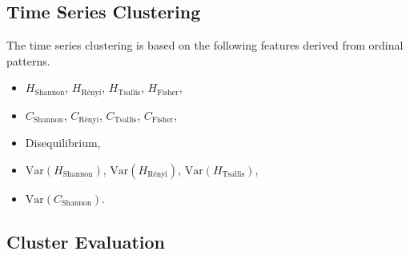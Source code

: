 \documentclass[12pt,a4paper]{article}
\begin{document}
\subsection{Time Series Clustering}
The time series clustering is based on the following features derived from ordinal patterns.

\begin{itemize}
	\item $H_{\text{Shannon}}$,
	$H_{\text{Rényi}}$,
	$H_{\text{Tsallis}}$,
	$H_{\text{Fisher}}$,
	
	\item $C_{\text{Shannon}}$,
	$C_{\text{Rényi}}$,
	$C_{\text{Tsallis}}$,
	$C_{\text{Fisher}}$,
	
	\item Disequilibrium,
	
	\item $\mathrm{Var}(H_{\text{Shannon}})$,
	$\mathrm{Var}(H_{\text{Rényi}})$,
	$\mathrm{Var}(H_{\text{Tsallis}})$,
	
	\item $\mathrm{Var}(C_{\text{Shannon}})$.
\end{itemize}

\subsection{Cluster Evaluation}


	


%
\end{document}
